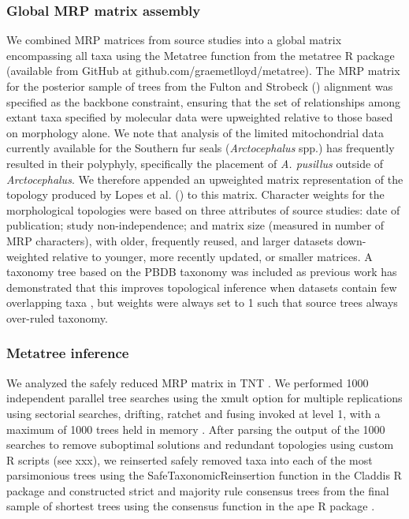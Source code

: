 \documentclass[a4paper, 12pt]{article}
\begin{document}
\begin{landscape}
\subsubsection{Global MRP matrix assembly} 

We combined MRP matrices from source studies into a global matrix encompassing all taxa using the Metatree function from the metatree R package (available from GitHub at github.com/graemetlloyd/metatree). The MRP matrix for the posterior sample of trees from the Fulton and Strobeck (\citeyear{fulton2010multiple}) alignment was specified as the backbone constraint, ensuring that the set of relationships among extant taxa specified by molecular data were upweighted relative to those based on morphology alone. We note that analysis of the limited mitochondrial data currently available for the Southern fur seals (\textit{Arctocephalus} spp.) has frequently resulted in their polyphyly, specifically the placement of \textit{A. pusillus} outside of \textit{Arctocephalus}. We therefore appended an upweighted matrix representation of the topology produced by Lopes et al. (\citeyear{lopes2021phylogenomic}) to this matrix. Character weights for the morphological topologies were based on three attributes of source studies: date of publication; study non-independence; and matrix size (measured in number of MRP characters), with older, frequently reused, and larger datasets down-weighted relative to younger, more recently updated, or smaller matrices. A taxonomy tree based on the PBDB taxonomy was included as previous work has demonstrated that this improves topological inference when datasets contain few overlapping taxa \citep{lloyd2021total}, but weights were always set to 1 such that source trees always over-ruled taxonomy.

\subsubsection{Metatree inference} 

We analyzed the safely reduced MRP matrix in TNT \citep{goloboff2008tnt}. We performed 1000 independent parallel tree searches using the xmult option for multiple replications using sectorial searches, drifting, ratchet and fusing invoked at level 1, with a maximum of 1000 trees held in memory \citep{goloboff2008tnt}. After parsing the output of the 1000 searches to remove suboptimal solutions and redundant topologies using custom R scripts (see xxx), we reinserted safely removed taxa into each of the most parsimonious trees using the SafeTaxonomicReinsertion function in the Claddis R package \citep{lloyd2016probabilistic} and constructed strict and majority rule consensus trees from the final sample of shortest trees using the consensus function in the ape R package \citep{paradis2019ape}.


\end{landscape}
\end{document}

